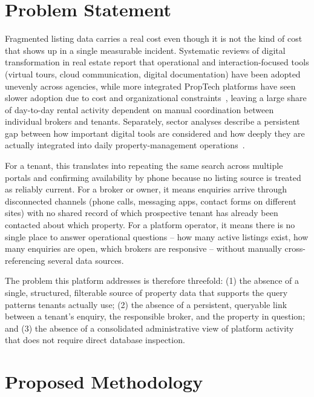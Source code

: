 \documentclass[10pt,twocolumn]{article}
\begin{document}
\section{Problem Statement}

Fragmented listing data carries a real cost even though it is not the kind of cost that shows up in a single measurable incident. Systematic reviews of digital transformation in real estate report that operational and interaction-focused tools (virtual tours, cloud communication, digital documentation) have been adopted unevenly across agencies, while more integrated PropTech platforms have seen slower adoption due to cost and organizational constraints~\cite{digitaltransform2025}, leaving a large share of day-to-day rental activity dependent on manual coordination between individual brokers and tenants. Separately, sector analyses describe a persistent gap between how important digital tools are considered and how deeply they are actually integrated into daily property-management operations~\cite{proptechmismatch2026}.

For a tenant, this translates into repeating the same search across multiple portals and confirming availability by phone because no listing source is treated as reliably current. For a broker or owner, it means enquiries arrive through disconnected channels (phone calls, messaging apps, contact forms on different sites) with no shared record of which prospective tenant has already been contacted about which property. For a platform operator, it means there is no single place to answer operational questions -- how many active listings exist, how many enquiries are open, which brokers are responsive -- without manually cross-referencing several data sources.

The problem this platform addresses is therefore threefold: (1) the absence of a single, structured, filterable source of property data that supports the query patterns tenants actually use; (2) the absence of a persistent, queryable link between a tenant's enquiry, the responsible broker, and the property in question; and (3) the absence of a consolidated administrative view of platform activity that does not require direct database inspection.

\section{Proposed Methodology}
\end{document}
